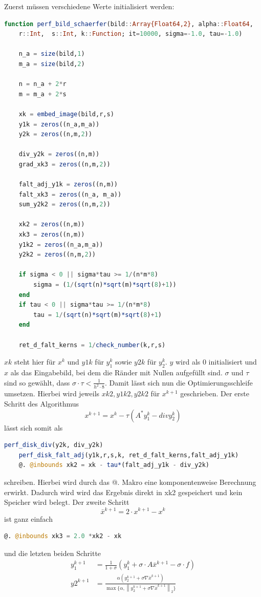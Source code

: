 \documentclass{article}
\theoremstyle{case}
\newcommand{\norm}[1]{\left\lVert#1\right\rVert}
\begin{document}
Zuerst müssen verschiedene Werte initialisiert werden:
\begin{lstlisting}[language=Julia]
function perf_bild_schaerfer(bild::Array{Float64,2}, alpha::Float64,
	r::Int,  s::Int, k::Function; it=10000, sigma=-1.0, tau=-1.0)
	
	n_a = size(bild,1)
	m_a = size(bild,2)

	n = n_a + 2*r
	m = m_a + 2*s

	xk = embed_image(bild,r,s)
	y1k = zeros((n_a,m_a))
	y2k = zeros((n,m,2))

	div_y2k = zeros((n,m))
	grad_xk3 = zeros((n,m,2))

	falt_adj_y1k = zeros((n,m))
	falt_xk3 = zeros((n_a, m_a))
	sum_y2k2 = zeros((n,m,2))

	xk2 = zeros((n,m))
	xk3 = zeros((n,m))
	y1k2 = zeros((n_a,m_a))
	y2k2 = zeros((n,m,2))

	if sigma < 0 || sigma*tau >= 1/(n*m*8)
		sigma = (1/(sqrt(n)*sqrt(m)*sqrt(8)+1))
	end
	if tau < 0 || sigma*tau >= 1/(n*m*8)
		tau = 1/(sqrt(n)*sqrt(m)*sqrt(8)+1)
	end
	
	ret_d_falt_kerns = 1/check_number(k,r,s)
\end{lstlisting}
$xk$ steht hier für $x^{k}$ und $y1k$ für $y_{1}^{k}$ sowie $y2k$ für $y_{2}^{k}$. $y$ wird als $0$ initialisiert und $x$ als das Eingabebild, bei dem die Ränder mit Nullen aufgefüllt sind. $\sigma$ und $\tau$ sind so gewählt, dass $\sigma\cdot \tau < \frac{1}{h^{2}\cdot 8}$. Damit lässt sich nun die Optimierungsschleife umsetzen. Hierbei wird jeweils $xk2, y1k2,y2k2$ für $x^{k+1}$ geschrieben. Der erste Schritt des Algorithmus
\[
x^{k+1} = x^{k} - \tau (A^{*}y_{1}^{k} - div y_{2}^{k})
\]
lässt sich somit als
\begin{lstlisting}[language=Julia]
	perf_disk_div(y2k, div_y2k)
	perf_disk_falt_adj(y1k,r,s,k, ret_d_falt_kerns,falt_adj_y1k)
	@. @inbounds xk2 = xk - tau*(falt_adj_y1k - div_y2k)
\end{lstlisting}
schreiben.
Hierbei wird durch das @. Makro eine komponentenweise Berechnung erwirkt. Dadurch wird wird das Ergebnis direkt in xk2 gespeichert und kein Speicher wird belegt.\newline
Der zweite Schritt
\[
\bar{x}^{k+1} = 2\cdot x^{k+1} - x^{k}
\]
ist ganz einfach
\begin{lstlisting}[language=Julia]
	@. @inbounds xk3 = 2.0 *xk2 - xk
\end{lstlisting}
und die letzten beiden Schritte
\begin{align*}
y_{1}^{k+1} &= \frac{1}{1+\sigma} (y_{1}^{k} + \sigma\cdot A \bar{x}^{k+1} - \sigma\cdot f) \\
y{2}^{k+1} &= \frac{\alpha (y_{2}^{k+1} + \sigma \nabla \bar{x}^{k+1} )}{\max\{\alpha, \norm{y_{2}^{k+1} + \sigma \nabla \bar{x}^{k+1} }_{2}\}}
\end{align*}
\end{document}

